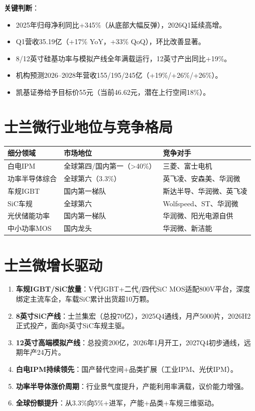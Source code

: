 \documentclass[a4paper,11pt,fontset=none]{ctexart}
\begin{document}
\textbf{关键判断}：
\begin{itemize}
  \item 2025年归母净利同比+345\%（从底部大幅反弹），2026Q1延续高增。
  \item Q1营收35.19亿（+17\% YoY，+33\% QoQ），环比改善显著。
  \item 8/12英寸硅基功率与模拟产线全年满载运行，12英寸产出同比+19\%。
  \item 机构预测2026--2028年营收155/195/245亿（+19\%/+26\%/+26\%）。
  \item 凯基证券给予目标价55元（当前46.62元，潜在上行空间18\%）。
\end{itemize}

\section{士兰微行业地位与竞争格局}

\begin{tabularx}{\textwidth}{L{3cm}L{3cm}X}
\toprule
\textbf{细分领域} & \textbf{市场地位} & \textbf{竞争对手} \\
\midrule
白电IPM & 全球第四/国内第一（>40\%） & 三菱、富士电机 \\
功率半导体综合 & 全球第六（3.3\%） & 英飞凌、安森美、华润微 \\
车规IGBT & 国内第一梯队 & 斯达半导、华润微、英飞凌 \\
SiC车规 & 全球第六 & Wolfspeed、ST、华润微 \\
光伏储能功率 & 国内第一梯队 & 华润微、阳光电源自供 \\
中小功率MOS & 国内龙头 & 华润微、新洁能 \\
\bottomrule
\end{tabularx}

\section{士兰微增长驱动}

\begin{enumerate}
  \item \textbf{车规IGBT/SiC放量}：V代IGBT+二代/四代SiC MOS适配800V平台，深度绑定主流车企，车载SiC累计出货超10万颗。
  \item \textbf{8英寸SiC产线}：士兰集宏（总投70亿），2025Q4通线，月产5000片，2026H2正式投产，面向8英寸SiC车规主驱。
  \item \textbf{12英寸高端模拟产线}：总投资200亿，2026年1月开工，2027Q4初步通线，远期年产24万片。
  \item \textbf{白电IPM持续领先}：国产替代空间+品类扩展（工业IPM、光伏IPM）。
  \item \textbf{功率半导体涨价周期}：行业景气度提升，产能利用率满载，议价能力增强。
  \item \textbf{全球份额提升}：从3.3\%向5\%+进军，产能+品类+车规三维驱动。
\end{enumerate}
\end{document}
